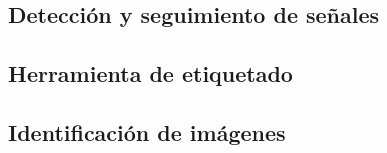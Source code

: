 \subsection{Detección y seguimiento de señales}	
	

\subsection{Herramienta de etiquetado}
	
	
\subsection{Identificación de imágenes}